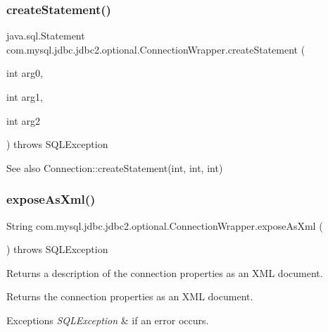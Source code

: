 \subsubsection{\texorpdfstring{create\+Statement()}{createStatement()}\hspace{0.1cm}{\footnotesize\ttfamily [3/3]}}
{\footnotesize\ttfamily java.\+sql.\+Statement com.\+mysql.\+jdbc.\+jdbc2.\+optional.\+Connection\+Wrapper.\+create\+Statement (\begin{DoxyParamCaption}\item[{int}]{arg0,  }\item[{int}]{arg1,  }\item[{int}]{arg2 }\end{DoxyParamCaption}) throws S\+Q\+L\+Exception}

\begin{DoxySeeAlso}{See also}
Connection\+::create\+Statement(int, int, int) 
\end{DoxySeeAlso}
\mbox{\label{classcom_1_1mysql_1_1jdbc_1_1jdbc2_1_1optional_1_1_connection_wrapper_ac3ce990dbc68f651981e2fddf73e9df8}} 
\subsubsection{\texorpdfstring{expose\+As\+Xml()}{exposeAsXml()}}
{\footnotesize\ttfamily String com.\+mysql.\+jdbc.\+jdbc2.\+optional.\+Connection\+Wrapper.\+expose\+As\+Xml (\begin{DoxyParamCaption}{ }\end{DoxyParamCaption}) throws S\+Q\+L\+Exception}

Returns a description of the connection properties as an X\+ML document.

\begin{DoxyReturn}{Returns}
the connection properties as an X\+ML document. 
\end{DoxyReturn}

\begin{DoxyExceptions}{Exceptions}
{\em S\+Q\+L\+Exception} & if an error occurs. \\
\hline
\end{DoxyExceptions}


